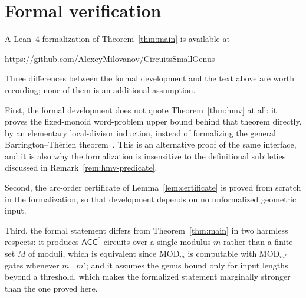 \documentclass[11pt]{article}
\theoremstyle{definition}
\theoremstyle{remark}
\newcommand{\ACC}{\mathsf{ACC}^0}
\begin{document}
\appendix
\section{Formal verification}\label{sec:formal}
A Lean~4 formalization of Theorem~\ref{thm:main} is available at
\begin{center}
\url{https://github.com/AlexeyMilovanov/CircuitsSmallGenus}
\end{center}
Three differences between
the formal development and the text above are worth recording; none of them is an
additional assumption.

First, the formal development does not quote Theorem~\ref{thm:hmv} at all: it proves the
fixed-monoid word-problem upper bound behind that theorem directly, by an elementary
local-divisor induction, instead of formalizing the general Barrington--Th\'erien
theorem~\cite{BT88}.  This is an alternative proof of the same interface, and it is also
why the formalization is insensitive to the definitional subtleties discussed in
Remark~\ref{rem:hmv-predicate}.

Second, the arc-order certificate of Lemma~\ref{lem:certificate} is proved from scratch
in the formalization, so that development depends on no unformalized geometric
input.

Third, the formal statement differs from Theorem~\ref{thm:main} in two harmless
respects: it produces $\ACC$ circuits over a single modulus $m$ rather than a finite
set $M$ of moduli, which is equivalent since $\mathrm{MOD}_{m}$ is computable with
$\mathrm{MOD}_{m'}$ gates whenever $m\mid m'$; and it assumes the genus bound only
for input lengths beyond a threshold, which makes the formalized statement
marginally stronger than the one proved here.
\end{document}
